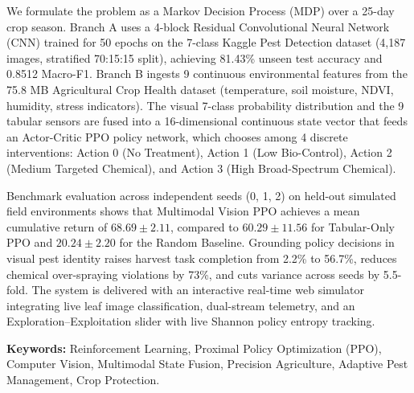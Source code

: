 \documentclass[12pt,a4paper]{report}
\begin{document}
We formulate the problem as a Markov Decision Process (MDP) over a 25-day crop season. Branch A uses a 4-block Residual Convolutional Neural Network (CNN) trained for 50 epochs on the 7-class Kaggle Pest Detection dataset (4,187 images, stratified 70:15:15 split), achieving 81.43\% unseen test accuracy and 0.8512 Macro-F1. Branch B ingests 9 continuous environmental features from the 75.8 MB Agricultural Crop Health dataset (temperature, soil moisture, NDVI, humidity, stress indicators). The visual 7-class probability distribution and the 9 tabular sensors are fused into a 16-dimensional continuous state vector that feeds an Actor-Critic PPO policy network, which chooses among 4 discrete interventions: Action 0 (No Treatment), Action 1 (Low Bio-Control), Action 2 (Medium Targeted Chemical), and Action 3 (High Broad-Spectrum Chemical).

Benchmark evaluation across independent seeds (0, 1, 2) on held-out simulated field environments shows that Multimodal Vision PPO achieves a mean cumulative return of $68.69 \pm 2.11$, compared to $60.29 \pm 11.56$ for Tabular-Only PPO and $20.24 \pm 2.20$ for the Random Baseline. Grounding policy decisions in visual pest identity raises harvest task completion from 2.2\% to 56.7\%, reduces chemical over-spraying violations by 73\%, and cuts variance across seeds by 5.5-fold. The system is delivered with an interactive real-time web simulator integrating live leaf image classification, dual-stream telemetry, and an Exploration–Exploitation slider with live Shannon policy entropy tracking.

\vspace{0.5cm}
\noindent\textbf{Keywords:} Reinforcement Learning, Proximal Policy Optimization (PPO), Computer Vision, Multimodal State Fusion, Precision Agriculture, Adaptive Pest Management, Crop Protection.

\newpage
\tableofcontents
\newpage
\listoffigures
\newpage
\listoftables
\end{document}
